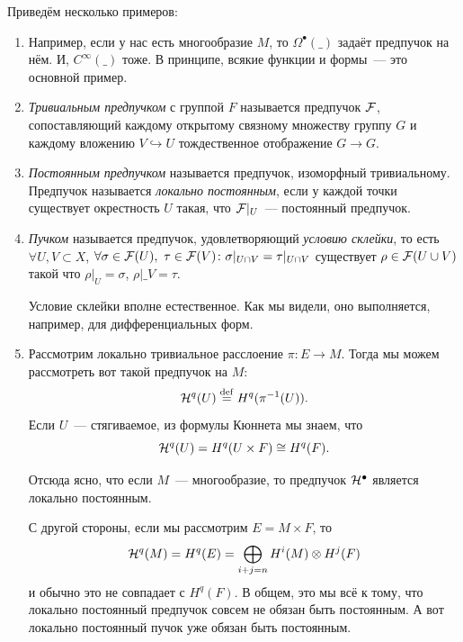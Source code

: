 	\begin{example}
		Приведём несколько примеров: 

		\begin{enumerate}
			\item Например, если у нас есть многообразие $M$, то  $\Omega^{\bullet}(\_)$ задаёт предпучок на нём. И, $C^{\infty}(\_)$ тоже. В принципе, всякие функции и формы~--- это основной пример. 

			\item \emph{Тривиальным предпучком} с группой $F$ называется предпучок $\mathcal{F}$, сопоставляющий каждому открытому связному множеству группу $G$ и каждому вложению $V \hookrightarrow U$ тождественное отображение $G \to G$. 

			\item \emph{Постоянным предпучком} называется предпучок, изоморфный тривиальному. Предпучок называется \emph{локально постоянным}, если у каждой точки существует окрестность $U$ такая, что $\mathcal{F}\vert_{U}$~--- постоянный предпучок. 

			\item \emph{Пучком} называется предпучок, удовлетворяющий \emph{условию склейки}, то есть $\forall U, V \subset X$, $\forall \sigma \in \mathcal{F}(U), \ \tau \in \mathcal{F}(V) \colon \sigma\vert_{U \cap V} = \tau\vert_{U \cap V}$ существует $\rho \in \mathcal{F}(U \cup V)$ такой что $\rho\vert_{U} = \sigma$, $\rho\vert\_{V} = \tau$.

			Условие склейки вполне естественное. Как мы видели, оно выполняется, например, для дифференциальных форм.  

			\item Рассмотрим локально тривиальное расслоение $\pi \colon E \to M$. Тогда мы можем рассмотреть вот такой предпучок на $M$:
			\[
				\mathcal{H}^{q}(U) \stackrel{\mathrm{def}}{=} H^q(\pi^{-1}(U)).
			\]
			Если $U$~--- стягиваемое, из формулы Кюннета мы знаем, что 
			\[
				\mathcal{H}^{q}(U) = H^q(U \times F) \cong H^q(F).
			\]

			Отсюда ясно, что если $M$~--- многообразие, то предпучок $\mathcal{H}^{\bullet}$ является локально постоянным. 

			С другой стороны, если мы рассмотрим $E = M \times F$, то 
			\[
				\mathcal{H}^{q}(M) = H^{q}(E) = \bigoplus_{i + j = n} H^i(M) \otimes H^{j}(F) 
			\]
			и обычно это не совпадает с $H^{q}(F)$. В общем, это мы всё к тому, что локально постоянный предпучок совсем не обязан быть постоянным. А вот локально постоянный пучок уже обязан быть постоянным. 
		\end{enumerate}

	\end{example}

